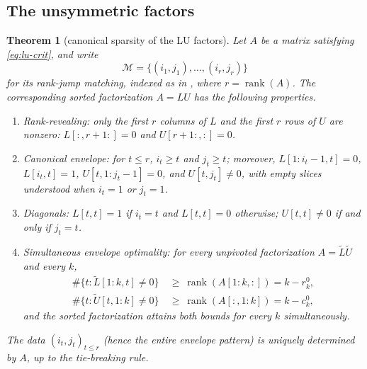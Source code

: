 \documentclass[preprint,12pt]{elsarticle}
\theoremstyle{plain}
\newtheorem{theorem}{Theorem}
\theoremstyle{nonumberplain}
\numberwithin{equation}{section}
\DeclareMathOperator{\rk}{rank}
\newcommand{\M}{\mathcal{M}}
\numberwithin{theorem}{section}
\begin{document}
\subsection{The unsymmetric factors}

\begin{theorem}[canonical sparsity of the LU factors]\label{thm:lu-sparsity}
  Let $A$ be a matrix satisfying \cref{eq:lu-crit}, and write
  \[
    \M=\{(i_1,j_1),\ldots,(i_r,j_r)\}
  \]
  for its rank-jump matching, indexed as in , where $r=\rk(A)$. The corresponding sorted factorization $A = LU$ has the following properties.
  \begin{enumerate}
    \item \emph{Rank-revealing:} only the first $r$ columns of $L$ and the first $r$ rows of $U$ are nonzero: $L[:, r+1:] = 0$ and $U[r+1:, :] = 0$.
    \item \emph{Canonical envelope:} for $t \le r$, $i_t\ge t$ and $j_t\ge t$; moreover, $L[1:i_t-1,t]=0$, $L[i_t,t]=1$, $U[t,1:j_t-1]=0$, and $U[t,j_t]\neq 0$, with empty slices understood when $i_t=1$ or $j_t=1$.
    \item \emph{Diagonals:} $L[t,t] = 1$ if $i_t = t$ and $L[t,t] = 0$ otherwise; $U[t,t] \neq 0$ if and only if $j_t = t$.
    \item \emph{Simultaneous envelope optimality:} for \emph{every} unpivoted factorization $A = \widetilde L \widetilde U$ and every $k$,
      \begin{align*}
        \#\{t \colon \widetilde L[1:k, t] \neq 0\} &\ \ge\ \rk(A[1:k,:])
        = k - r^0_k,\\
        \#\{t \colon \widetilde U[t, 1:k] \neq 0\} &\ \ge\ \rk(A[:,1:k])
        = k - c^0_k,
      \end{align*}
      and the sorted factorization attains both bounds for every $k$ simultaneously.
  \end{enumerate}
  The data $(i_t, j_t)_{t \le r}$ (hence the entire envelope pattern) is uniquely determined by $A$, up to the tie-breaking rule.
\end{theorem}
\end{document}
